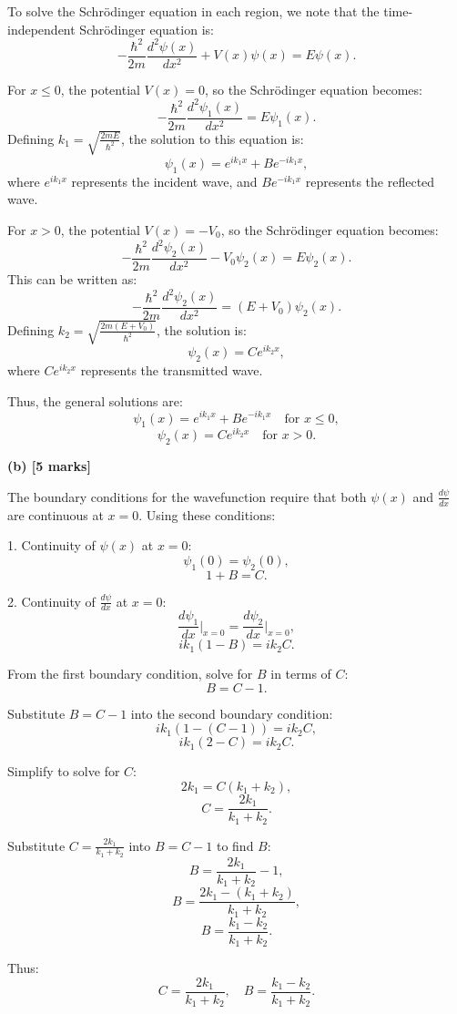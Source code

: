 To solve the Schrödinger equation in each region, we note that the time-independent Schrödinger equation is:
\[
-\frac{\hbar^2}{2m} \frac{d^2 \psi(x)}{dx^2} + V(x) \psi(x) = E \psi(x).
\]

For $x \leq 0$, the potential $V(x) = 0$, so the Schrödinger equation becomes:
\[
-\frac{\hbar^2}{2m} \frac{d^2 \psi_1(x)}{dx^2} = E \psi_1(x).
\]
Defining $k_1 = \sqrt{\frac{2mE}{\hbar^2}}$, the solution to this equation is:
\[
\psi_1(x) = e^{ik_1x} + Be^{-ik_1x},
\]
where $e^{ik_1x}$ represents the incident wave, and $Be^{-ik_1x}$ represents the reflected wave.

For $x > 0$, the potential $V(x) = -V_0$, so the Schrödinger equation becomes:
\[
-\frac{\hbar^2}{2m} \frac{d^2 \psi_2(x)}{dx^2} - V_0 \psi_2(x) = E \psi_2(x).
\]
This can be written as:
\[
-\frac{\hbar^2}{2m} \frac{d^2 \psi_2(x)}{dx^2} = (E + V_0) \psi_2(x).
\]
Defining $k_2 = \sqrt{\frac{2m(E + V_0)}{\hbar^2}}$, the solution is:
\[
\psi_2(x) = Ce^{ik_2x},
\]
where $Ce^{ik_2x}$ represents the transmitted wave.

Thus, the general solutions are:
\[
\psi_1(x) = e^{ik_1x} + Be^{-ik_1x} \quad \text{for } x \leq 0,
\]
\[
\psi_2(x) = Ce^{ik_2x} \quad \text{for } x > 0.
\]

\textbf{(b) [5 marks]}

The boundary conditions for the wavefunction require that both $\psi(x)$ and $\frac{d\psi}{dx}$ are continuous at $x = 0$. Using these conditions:

1. Continuity of $\psi(x)$ at $x = 0$:
\[
\psi_1(0) = \psi_2(0),
\]
\[
1 + B = C.
\]

2. Continuity of $\frac{d\psi}{dx}$ at $x = 0$:
\[
\frac{d\psi_1}{dx}\bigg|_{x=0} = \frac{d\psi_2}{dx}\bigg|_{x=0},
\]
\[
ik_1(1 - B) = ik_2C.
\]

From the first boundary condition, solve for $B$ in terms of $C$:
\[
B = C - 1.
\]

Substitute $B = C - 1$ into the second boundary condition:
\[
ik_1(1 - (C - 1)) = ik_2C,
\]
\[
ik_1(2 - C) = ik_2C.
\]

Simplify to solve for $C$:
\[
2k_1 = C(k_1 + k_2),
\]
\[
C = \frac{2k_1}{k_1 + k_2}.
\]

Substitute $C = \frac{2k_1}{k_1 + k_2}$ into $B = C - 1$ to find $B$:
\[
B = \frac{2k_1}{k_1 + k_2} - 1,
\]
\[
B = \frac{2k_1 - (k_1 + k_2)}{k_1 + k_2},
\]
\[
B = \frac{k_1 - k_2}{k_1 + k_2}.
\]

Thus:
\[
C = \frac{2k_1}{k_1 + k_2}, \quad B = \frac{k_1 - k_2}{k_1 + k_2}.
\]

